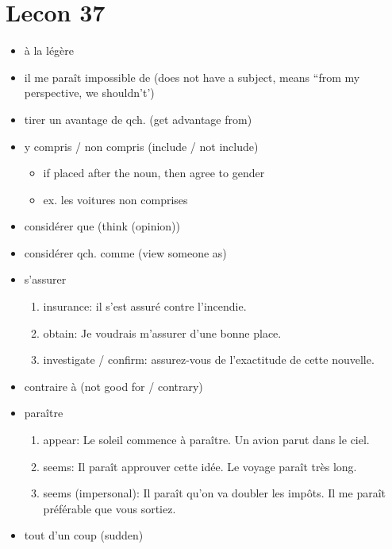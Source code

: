 \documentclass{book}
\begin{document}
\chapter{Lecon 37}
    \begin{itemize}
        \item à la légère %
        \item il me paraît impossible de (does not have a subject, means ``from my perspective, we shouldn't')
        \item tirer un avantage de qch. (get advantage from)
        \item y compris / non compris (include / not include)
            \begin{itemize}
                \item if placed after the noun, then agree to gender
                \item ex. les voitures non comprises
            \end{itemize}
        \item considérer que (think (opinion))
        \item considérer qch. comme (view someone as)
        \item s'assurer
            \begin{enumerate}
                \item insurance: il s'est assuré contre l'incendie.
                \item obtain: Je voudrais m'assurer d'une bonne place.
                \item investigate / confirm: assurez-vous de l'exactitude de cette nouvelle.
            \end{enumerate}
        \item contraire à (not good for / contrary)
        \item paraître
            \begin{enumerate}
                \item appear: Le soleil commence à paraître. Un avion parut dans le ciel.
                \item seems: Il paraît approuver cette idée. Le voyage paraît très long.
                \item seems (impersonal): Il paraît qu'on va doubler les impôts. Il me paraît préférable que vous sortiez.
            \end{enumerate}
        \item tout d'un coup (sudden)
    \end{itemize}
\end{document}

